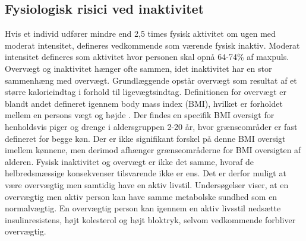 \subsection{Fysiologisk risici ved inaktivitet}\label{subsec:inover}
Hvis et individ udfører mindre end 2,5 times fysisk aktivitet om ugen med moderat intensitet, defineres vedkommende som værende fysisk inaktiv. Moderat intensitet defineres som aktivitet hvor personen skal opnå 64-74\% af maxpuls. \citep{Kiens2007} Overvægt og inaktivitet hænger ofte sammen, idet inaktivitet har en stor sammenhæng med overvægt. Grundlæggende opstår overvægt som resultat af et større kalorieindtag i forhold til ligevægtsindtag. \citep{Nestle2014} Definitionen for overvægt er blandt andet defineret igennem body mass index (BMI), hvilket er forholdet mellem en persons vægt og højde \citep{Academic2016}. Der findes en specifik BMI oversigt for henholdsvis piger og drenge i aldersgruppen 2-20 år, hvor grænseområder er fast defineret for begge køn. Der er ikke signifikant forskel på denne BMI oversigt imellem kønnene, men derimod afhænger grænseområderne for BMI oversigten af alderen. \citep{DiseaseControl2015}\newline
Fysisk inaktivitet og overvægt er ikke det samme, hvoraf de helbredsmæssige konsekvenser tilsvarende ikke er ens. Det er derfor muligt at være overvægtig men samtidig have en aktiv livstil. \citep{Kiens2007} Undersøgelser viser, at en overvægtig men aktiv person kan have samme metabolske sundhed som en normalvægtig. En overvægtig person kan igennem en aktiv livsstil nedsætte insulinresistens, højt kolesterol og højt bloktryk, selvom vedkommende forbliver overvægtig. \citep{Lunau2012,Marcelino2012}


